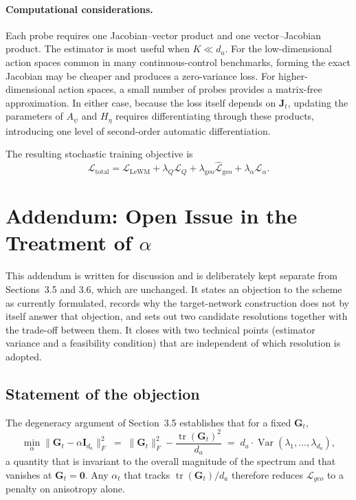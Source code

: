 ﻿\documentclass{article}
\begin{document}
\paragraph{Computational considerations.}
Each probe requires one Jacobian--vector product and one vector--Jacobian
product. The estimator is most useful when \(K\ll d_a\). For the
low-dimensional action spaces common in many continuous-control benchmarks,
forming the exact Jacobian may be cheaper and produces a zero-variance loss.
For higher-dimensional action spaces, a small number of probes provides a
matrix-free approximation. In either case, because the loss itself depends on
\(\mathbf{J}_t\), updating the parameters of \(A_{\psi}\) and \(H_{\eta}\)
requires differentiating through these products, introducing one level of
second-order automatic differentiation.

The resulting stochastic training objective is
\[
\mathcal{L}_{\mathrm{total}}
=
\mathcal{L}_{\mathrm{LeWM}}
+
\lambda_Q\mathcal{L}_Q
+
\lambda_{\mathrm{geo}}
\widehat{\mathcal{L}}_{\mathrm{geo}}
+
\lambda_{\alpha}
\widehat{\mathcal{L}}_{\alpha}.
\]


\providecommand{\sg}{\operatorname{sg}}

\section{Addendum: Open Issue in the Treatment of $\alpha$}
\label{sec:addendum-alpha}

This addendum is written for discussion and is deliberate\-ly kept separate
from Sections~3.5 and 3.6, which are unchanged. It states an objection to the
scheme as currently formulated, records why the target-network construction
does not by itself answer that objection, and sets out two candidate
resolutions together with the trade-off between them. It closes with two
technical points (estimator variance and a feasibility condition) that are
independent of which resolution is adopted.

\subsection{Statement of the objection}
\label{sec:addendum-objection}

The degeneracy argument of Section~3.5 establishes that for a fixed
$\mathbf{G}_t$,
\[
  \min_{\alpha}\bigl\|\mathbf{G}_t-\alpha\mathbf{I}_{d_a}\bigr\|_F^2
  \;=\;
  \|\mathbf{G}_t\|_F^2-\frac{\operatorname{tr}(\mathbf{G}_t)^2}{d_a}
  \;=\;
  d_a\cdot\operatorname{Var}(\lambda_1,\dots,\lambda_{d_a}),
\]
a quantity that is invariant to the overall magnitude of the spectrum and
that vanishes at $\mathbf{G}_t=\mathbf{0}$. Any $\alpha_t$ that tracks
$\operatorname{tr}(\mathbf{G}_t)/d_a$ therefore reduces $\mathcal{L}_{geo}$ to
a penalty on anisotropy alone.
\end{document}
